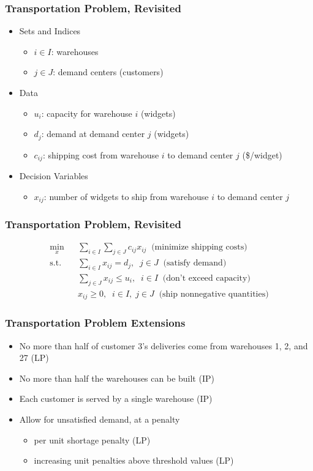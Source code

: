 \documentclass[12pt,handout]{beamer}
\begin{document}
\begin{frame}
\frametitle{Transportation Problem, Revisited}
\begin{itemize}
\item Sets and Indices
    \begin{itemize}
    \item $i \in I$: warehouses
    \item $j \in J$: demand centers (customers)
    \end{itemize}
\item Data
    \begin{itemize}
    \item $u_i$: capacity for warehouse $i$ (widgets)
    \item $d_j$: demand at demand center $j$ (widgets)
    \item $c_{ij}$: shipping cost from warehouse $i$ to demand center $j$ (\$/widget)
    \end{itemize}
\item Decision Variables
    \begin{itemize}
    \item $x_{ij}$: number of widgets to ship from warehouse $i$ to demand center $j$
    \end{itemize}
\end{itemize}
\end{frame}

\begin{frame}
\frametitle{Transportation Problem, Revisited}
\begin{eqnarray}
\min_{x} && \sum_{i \in I} \sum_{j \in J} c_{ij} x_{ij} \;\; \mbox{(minimize shipping costs)} \nonumber \\
\mbox{s.t.} && \sum_{i \in I} x_{ij} = d_j,\;\;j \in J \;\; \mbox{(satisfy demand)}\nonumber \\
&& \sum_{j \in J} x_{ij} \le u_i,\;\;i \in I \;\; \mbox{(don't exceed capacity)} \nonumber \\
&& x_{ij} \ge 0, \;\;i \in I,\;j \in J \;\; \mbox{(ship nonnegative quantities)} \nonumber
\end{eqnarray}
\end{frame}

\begin{frame}
\frametitle{Transportation Problem Extensions}
\begin{itemize}
\item No more than half of customer 3's deliveries come from warehouses 1, 2, and 27 (LP)
\item No more than half the warehouses can be built (IP)
\item Each customer is served by a single warehouse (IP)
\item Allow for unsatisfied demand, at a penalty
    \begin{itemize}
    \item per unit shortage penalty (LP)
    \item increasing unit penalties above threshold values (LP)
    \end{itemize}
\end{itemize}
\end{frame}
\end{document}
